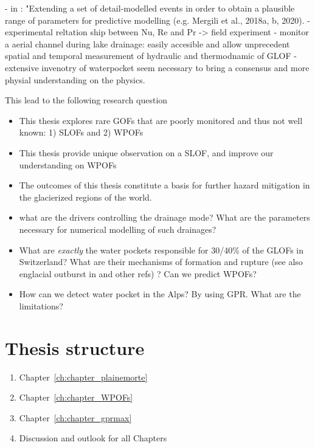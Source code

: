     
     - in \cite{Emmer&al2022}: "Extending a set of detail-modelled events in order to obtain a plausible range of parameters for predictive modelling (e.g. Mergili et al., 2018a, b, 2020).
    - experimental reltation ship between Nu, Re and Pr -> field experiment
    - monitor a aerial channel during lake drainage: easily accesible and allow unprecedent spatial and temporal measurement of hydraulic and thermodnamic of GLOF
     - extensive invenotry of waterpocket seem necessary to bring a consensus and more physial understanding on the physics.


This lead to the following research question


\begin{itemize}
   \item This thesis explores rare GOFs that are poorly monitored and thus not well known: 1) SLOFs and 2) WPOFs
    \item This thesis provide unique observation on a SLOF, and improve our understanding on WPOFs 
    \item The outcomes of this thesis constitute a basis for further hazard mitigation in the glacierized regions of the world.
    \item  what are the drivers controlling the drainage mode? What are the parameters necessary for numerical modelling of such drainages?
    \item What are \textit{exactly} the water pockets responsible for 30/40\% of the GLOFs in Switzerland? What are their mechanisms of formation and rupture (see also englacial outburst in \cite{Korup&Tweed2007} and other refs) ? Can we predict WPOFs?
    \item  How can we detect water pocket in the Alps? By using GPR. What are the limitations?
\end{itemize}

\section{Thesis structure}


\begin{enumerate}
\item Chapter~\ref{ch:chapter_plainemorte}
\item Chapter~\ref{ch:chapter_WPOFs}
\item Chapter~\ref{ch:chapter_gprmax}
\item Discussion and outlook for all Chapters
\end{enumerate}


